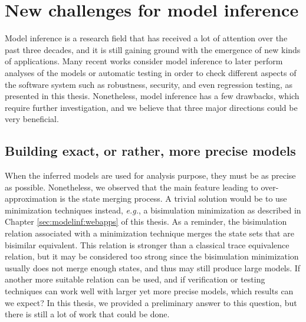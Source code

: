 \section{New challenges for model inference}
\label{sec:conclusion:modelinf}

Model inference is a research field that has received a lot of
attention over the past three decades, and it is still gaining
ground with the emergence of new kinds of applications. Many
recent works consider model inference to later perform analyses
of the models or automatic testing in order to check different
aspects of the software system such as robustness, security, and
even regression testing, as presented in this thesis.
Nonetheless, model inference has a few drawbacks, which require
further investigation, and we believe that three major directions
could be very beneficial.

\subsection{Building exact, or rather, more precise models}
\label{sec:conclusion:modelinf:exact}

When the inferred models are used for analysis purpose, they must be as
precise as possible. Nonetheless, we observed that the main
feature leading to over-approximation is the state merging
process. A trivial solution would be to use minimization
techniques instead, \emph{e.g.}, a bisimulation minimization as
described in Chapter \ref{sec:modelinf:webapps} of this thesis.
As a reminder, the bisimulation relation associated with a
minimization technique merges the state sets that are bisimilar
equivalent. This relation is stronger than a classical trace
equivalence relation, but it may be considered too strong since the
bisimulation minimization usually does not merge enough states,
and thus may still produce large models. If another more suitable
relation can be used, and if verification or testing techniques
can work well with larger yet more precise models, which results
can we expect? In this thesis, we provided a preliminary answer
to this question, but there is still a lot of work that could be
done.

